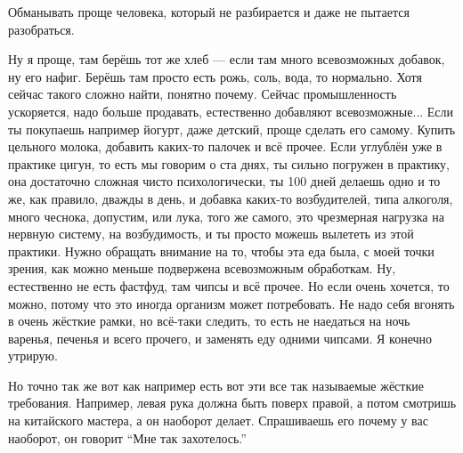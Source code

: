 \A
Обманывать проще человека, который не разбирается и даже не пытается разобраться.

\T
Ну я проще, там берёшь тот же хлеб --- если там много всевозможных
добавок, ну его нафиг.
Берёшь там просто есть рожь, соль, вода, то нормально. Хотя сейчас такого сложно найти,
понятно почему. Сейчас
промышленность ускоряется, надо больше продавать, естественно добавляют всевозможные...
Если ты
покупаешь например йогурт, даже детский, проще сделать его самому.
Купить цельного
молока, добавить каких-то
палочек и всё прочее.\hfil\break
\indent
Если углублён уже в практике
цигун, то есть мы
говорим о ста днях, ты сильно погружен в практику, она достаточно сложная чисто психологически,
ты 100
дней делаешь одно и то
же, как правило, дважды в день, и добавка каких-то возбудителей, типа алкоголя, много чеснока,
допустим, или лука, того
же самого, это чрезмерная нагрузка на нервную систему, на возбудимость, и ты просто можешь
вылететь из этой
практики.\hfil\break
\indent
Нужно обращать внимание на то, чтобы эта еда была, с моей точки зрения,
как можно меньше подвержена
всевозможным
обработкам.
Ну, естественно не есть фастфуд, там чипсы и всё прочее.
Но если очень
хочется, то можно, потому что
это иногда организм может потребовать.
Не надо себя вгонять в
очень жёсткие рамки, но
всё-таки следить, то есть не наедаться на ночь варенья, печенья и всего прочего, и заменять
еду одними чипсами. Я конечно
утрирую.

\A
Но точно так же вот как например есть вот эти все так называемые жёсткие требования.
Например,
левая рука должна быть
поверх правой, а потом смотришь на китайского мастера, а он наоборот делает.
Спрашиваешь его
почему у вас наоборот, он
говорит ``Мне так захотелось.''

